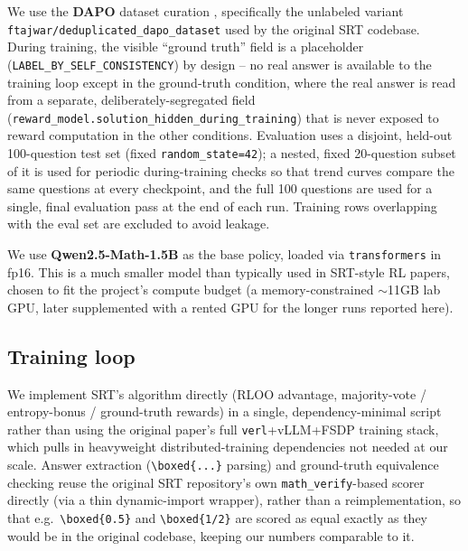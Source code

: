 \documentclass{article}
\begin{document}
We use the \textbf{DAPO} dataset curation \citep{yu2025dapo}, specifically
the unlabeled variant \texttt{ftajwar/deduplicated\_dapo\_dataset} used by
the original SRT codebase. During training, the visible ``ground truth''
field is a placeholder (\texttt{LABEL\_BY\_SELF\_CONSISTENCY}) by design --
no real answer is available to the training loop except in the ground-truth
condition, where the real answer is read from a separate,
deliberately-segregated field
(\texttt{reward\_model.solution\_hidden\_during\_training}) that is never
exposed to reward computation in the other conditions. Evaluation uses a disjoint,
held-out 100-question test set (fixed \texttt{random\_state=42}); a nested,
fixed 20-question subset of it is used for periodic during-training checks
so that trend curves compare the same questions at every checkpoint, and the
full 100 questions are used for a single, final evaluation pass at the end
of each run. Training rows overlapping with the eval set are excluded to
avoid leakage.

We use \textbf{Qwen2.5-Math-1.5B} as the base policy, loaded via
\texttt{transformers} in fp16. This is a much smaller model than typically
used in SRT-style RL papers, chosen to fit the project's compute budget
(a memory-constrained $\sim$11GB lab GPU, later supplemented with a rented
GPU for the longer runs reported here).

\subsection{Training loop}

We implement SRT's algorithm directly (RLOO advantage, majority-vote /
entropy-bonus / ground-truth rewards) in a single, dependency-minimal script rather
than using the original paper's full \texttt{verl}+vLLM+FSDP training stack,
which pulls in heavyweight distributed-training dependencies not needed at
our scale. Answer extraction (\verb|\boxed{...}| parsing) and
ground-truth equivalence checking reuse the original SRT repository's own
\texttt{math\_verify}-based scorer directly (via a thin dynamic-import
wrapper), rather than a reimplementation, so that e.g.\ \verb|\boxed{0.5}|
and \verb|\boxed{1/2}| are scored as equal exactly as they would be in the
original codebase, keeping our numbers comparable to it.
\end{document}
